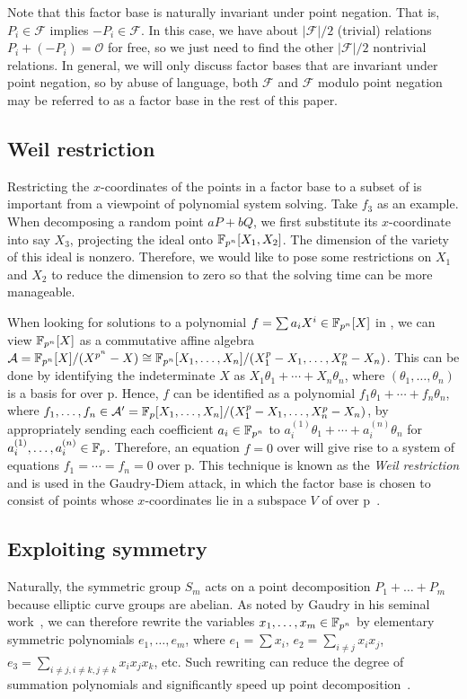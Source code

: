 Note that this factor base is naturally invariant under point
negation.
%
That is, $P_i\in\mathcal F$ implies $-P_i\in\mathcal F$.
%
In this case, we have about $|\mathcal F|/2$ (trivial) relations
$P_i+(-P_i)=\mathcal O$ for free, so we just need to find the other
$|\mathcal F|/2$ nontrivial relations.
%
In general, we will only discuss factor bases that are invariant under
point negation, so by abuse of language, both $\mathcal F$ and
$\mathcal F$ modulo point negation may be referred to as a factor base
in the rest of this paper.

\subsection{Weil restriction}
\label{sec:weil-restriction}
%
Restricting the $x$-coordinates of the points in a factor base to a
subset of  is important from a viewpoint of polynomial system
solving.
%
Take $f_3$ as an example.
%
When decomposing a random point $aP+bQ$, we first substitute its
$x$-coordinate into say $X_3$, projecting the ideal onto
$\mathbb F_{p^n}[X_1,X_2]$.
%
The dimension of the variety of this ideal is nonzero.
%
Therefore, we would like to pose some restrictions on $X_1$ and $X_2$
to reduce the dimension to zero so that the solving time can be more
manageable.

When looking for solutions to a polynomial
$f=\sum a_iX^i\in\mathbb F_{p^n}[X]$ in , we can view $\mathbb F_{p^n}[X]$ as a
commutative affine algebra
$\mathcal A=\mathbb F_{p^n}[X]/(X^{p^n} -
X)\cong\mathbb F_{p^n}[X_1,\ldots,X_n]/(X_1^p - X_1,\ldots,X_n^p - X_n)$.
%
This can be done by identifying the indeterminate $X$ as
$X_1\theta_1+\cdots+X_n\theta_n$, where $(\theta_1,\ldots,\theta_n)$
is a basis for  over \F p.
%
Hence, $f$ can be identified as a polynomial
$f_1\theta_1+\cdots+f_n\theta_n$, where
$f_1,\ldots,f_n\in\mathcal A'=\mathbb F_{p}[X_1,\ldots,X_n]/(X_1^p -
X_1,\ldots,X_n^p - X_n)$, by appropriately sending each coefficient
$a_i\in\mathbb F_{p^n}$ to $a_i^{(1)}\theta_1+\cdots+a_i^{(n)}\theta_n$ for
$a_i^{(1)},\ldots,a_i^{(n)}\in\mathbb F_{p}$.
%
Therefore, an equation $f=0$ over  will give rise to a system
of equations $f_1=\cdots=f_n=0$ over \F p.
%
This technique is known as the \emph{Weil restriction} and is used in
the Gaudry-Diem attack, in which the factor base is chosen to consist
of points whose $x$-coordinates lie in a subspace $V$ of  over
\F p~\cite{DBLP:journals/jsc/Gaudry09,DBLP:journals/moc/Diem11}.

\subsection{Exploiting symmetry}
%
\label{sec:exploit-symmetry}
%
Naturally, the symmetric group $S_m$ acts on a point decomposition
$P_1+\ldots+P_m$ because elliptic curve groups are abelian.
%
As noted by Gaudry in his seminal
work~\cite{DBLP:journals/jsc/Gaudry09}, we can therefore rewrite the
variables $x_1,\ldots,x_m\in\mathbb F_{p^n}$ by elementary symmetric
polynomials $e_1,\ldots,e_m$, where $e_1=\sum x_i$,
$e_2=\sum_{i\neq j}x_ix_j$,
$e_3=\sum_{i\neq j,i\neq k,j\neq k}x_ix_jx_k$, etc.
%
Such rewriting can reduce the degree of summation polynomials and
significantly speed up point
decomposition~\cite{DBLP:conf/eurocrypt/FaugerePPR12,DBLP:conf/iwsec/HuangPST13}.

